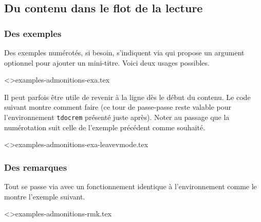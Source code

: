 \subsection{Du contenu dans le flot de la lecture}




\subsubsection{Des exemples}

Des exemples numérotés, si besoin, s'indiquent via  qui propose un argument optionnel pour ajouter un mini-titre.
Voici deux usages possibles.

\tdoclatexinput<>{examples-admonitions-exa.tex}


\begin{tdoctip}
    Il peut parfois être utile de revenir à la ligne dès le début du contenu. Le code suivant montre comment faire (ce tour de passe-passe reste valable pour l'environnement \verb#tdocrem# présenté juste après). Noter au passage que la numérotation suit celle de l'exemple précédent comme souhaité.
\end{tdoctip}

\tdoclatexinput<>{examples-admonitions-exa-leavevmode.tex}



\subsubsection{Des remarques}

Tout se passe via  avec un fonctionnement identique à l'environnement  comme le montre l'exemple suivant.


\tdoclatexinput<>{examples-admonitions-rmk.tex}


